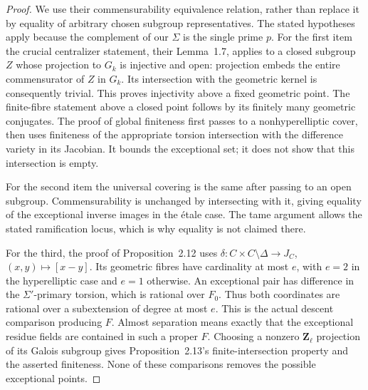 \documentclass[11pt]{article}
\begin{document}
\begin{proof}
We use their commensurability equivalence relation, rather than replace
it by equality of arbitrary chosen subgroup representatives.  The
stated hypotheses apply because the complement of our $\Sigma$ is
the single prime $p$.  For the first item the crucial centralizer
statement, their Lemma~1.7, applies to a closed subgroup $Z$ whose
projection to $G_k$ is injective and open: projection embeds the entire
commensurator of $Z$ in $G_k$.  Its intersection with the geometric
kernel is consequently trivial.  This proves injectivity above a
fixed geometric point.  The finite-fibre statement above a closed
point follows by its finitely many geometric conjugates.  The proof
of global finiteness first passes to a nonhyperelliptic cover, then
uses finiteness of the appropriate torsion intersection with the
difference variety in its Jacobian.  It bounds the exceptional set;
it does not show that this intersection is empty.

For the second item the universal covering is the same after passing
to an open subgroup.  Commensurability is unchanged by intersecting
with it, giving equality of the exceptional inverse images in the
\'etale case.  The tame argument allows the stated ramification locus,
which is why equality is not claimed there.

For the third, the proof of Proposition~2.12 uses
$\delta:C\times C\setminus\Delta\to J_C$,
$(x,y)\mapsto[x-y]$.  Its geometric fibres have cardinality at most
$e$, with $e=2$ in the hyperelliptic case and $e=1$ otherwise.
An exceptional pair has difference in the $\Sigma'$-primary torsion,
which is rational over $F_0$.  Thus both coordinates are rational
over a subextension of degree at most $e$.  This is the actual
descent comparison producing $F$.  Almost separation means exactly
that the exceptional residue fields are contained in such a proper
$F$.  Choosing a nonzero $\mathbf Z_\ell$ projection of its Galois
subgroup gives Proposition~2.13's finite-intersection property and
the asserted finiteness.  None of these comparisons removes the
possible exceptional points.
\end{proof}
\end{document}
